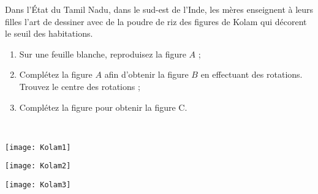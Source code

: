 
\begin{TP}

\begin{minipage}[t]{0.48\linewidth}
Dans l'État du Tamil Nadu, dans le sud-est de l'Inde, les mères enseignent à leurs filles l'art de dessiner avec de la poudre de riz des figures de Kolam qui décorent le seuil des habitations.
 \end{minipage} \hfill%
 \begin{minipage}[t]{0.48\linewidth}
 \begin{enumerate}
  \item Sur une feuille blanche, reproduisez la figure $A$ ;
  \item Complétez la figure $A$ afin d'obtenir la figure $B$ en effectuant des rotations. Trouvez le centre des rotations ;
  \item Complétez la figure pour obtenir la figure C. 
  \end{enumerate}
  \end{minipage} \\
  
\begin{minipage}[t]{0.32\linewidth}
 \texttt{[image: Kolam1]}
 \end{minipage} \hfill%
 \begin{minipage}[t]{0.32\linewidth}
  \texttt{[image: Kolam2]}
  \end{minipage} \hfill%
  \begin{minipage}[t]{0.32\linewidth}
   \texttt{[image: Kolam3]}
   \end{minipage} \\

\end{TP}

